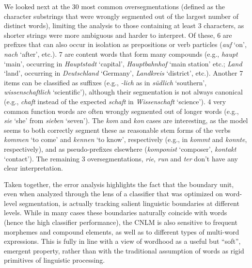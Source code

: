 We looked next at the 30 most common oversegmentations  (defined as the character substrings that were
wrongly segmented out of the largest number of distinct words),
limiting the analysis to those containing at least 3 characters, as
shorter strings were more ambiguous and harder to interpret. Of these,
6 are prefixes that can also occur in isolation as prepositions or
verb particles (\emph{auf} `on', \emph{nach} `after', etc.). 7 are
content words that form many compounds (e.g., \emph{haupt} `main',
occurring in \emph{Hauptstadt} `capital', \emph{Hauptbahnhof} `main
station' etc.; \emph{Land} `land', occurring in \emph{Deutschland}
`Germany', \emph{Landkreis} `district', etc.). Another 7 items can be
classified as suffixes (e.g., \emph{-lich} as in \emph{s\"udlich}
`southern', \emph{wissenschaftlich} `scientific'), although their
segmentation is not always canonical (e.g., \emph{chaft} instead of
the expected \emph{schaft} in \emph{Wissenschaft} `science'). 4 very
common function words are often wrongly segmented out of longer words
(e.g., \emph{sie} `she' from \emph{sieben} `seven'). The \emph{kom}
and \emph{kon} cases are interesting, as the model seems to both
correctly segment these as reasonable stem forms of the verbs
\emph{kommen} `to come' and \emph{kennen} `to know', respectively
(e.g., in \emph{kommt} and \emph{konnte}, respectively), and as
pseudo-prefixes elsewhere (\emph{komponist} `composer', \emph{kontakt}
`contact'). The remaining 3 oversegmentations, \emph{rie}, \emph{run}
and \emph{ter} don't have any clear interpretation.

Taken together, the error analysis highlights the fact that the
boundary unit, even when analyzed through the lens of a classifier
that was optimized on word-level segmentation, is actually tracking
salient linguistic boundaries at different levels. While in many cases
these boundaries naturally coincide with words (hence the high
classifier performance), the CNLM is also sensitive to frequent
morphemes and compound elements, as well as to different types of
multi-word expressions. This is fully in line with a view of wordhood
as a useful but ``soft'', emergent property, rather than with the
traditional assumption of words as rigid primitives of linguistic
processing.




